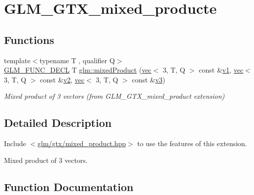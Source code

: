 \hypertarget{group__gtx__mixed__product}{}\section{G\+L\+M\+\_\+\+G\+T\+X\+\_\+mixed\+\_\+producte}
\label{group__gtx__mixed__product}
\subsection*{Functions}
\begin{DoxyCompactItemize}
\item 
{\footnotesize template$<$typename T , qualifier Q$>$ }\\\mbox{\hyperlink{setup_8hpp_ab2d052de21a70539923e9bcbf6e83a51}{G\+L\+M\+\_\+\+F\+U\+N\+C\+\_\+\+D\+E\+CL}} T \mbox{\hyperlink{group__gtx__mixed__product_gab3c6048fbb67f7243b088a4fee48d020}{glm\+::mixed\+Product}} (\mbox{\hyperlink{structglm_1_1vec}{vec}}$<$ 3, T, Q $>$ const \&\mbox{\hyperlink{_s_d_l__opengl__glext_8h_a435c176a02c061b43e19bdf7c86cceae}{v1}}, \mbox{\hyperlink{structglm_1_1vec}{vec}}$<$ 3, T, Q $>$ const \&\mbox{\hyperlink{_s_d_l__opengl__glext_8h_a0928f6d0f0f794ba000a21dfae422136}{v2}}, \mbox{\hyperlink{structglm_1_1vec}{vec}}$<$ 3, T, Q $>$ const \&\mbox{\hyperlink{_s_d_l__opengl__glext_8h_acc806b31cbf466ceba6555983d8b814d}{v3}})
\begin{DoxyCompactList}\small\item\em Mixed product of 3 vectors (from G\+L\+M\+\_\+\+G\+T\+X\+\_\+mixed\+\_\+product extension) \end{DoxyCompactList}\end{DoxyCompactItemize}


\subsection{Detailed Description}
Include $<$\mbox{\hyperlink{mixed__product_8hpp}{glm/gtx/mixed\+\_\+product.\+hpp}}$>$ to use the features of this extension.

Mixed product of 3 vectors. 

\subsection{Function Documentation}
\mbox{\label{group__gtx__mixed__product_gab3c6048fbb67f7243b088a4fee48d020}} 
